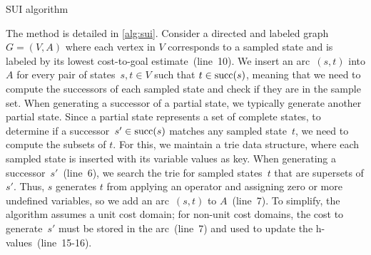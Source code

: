 \begin{algorithm}[tb]
    \caption{SUI algorithm}
    \label{alg:sui}

    \SetAlgoLined


\end{algorithm}

The method is detailed in \cref{alg:sui}. Consider a directed and labeled graph~$G=(V,A)$ where each vertex in $V$ corresponds to a sampled state and is labeled by its lowest cost-to-goal estimate~(line~10). We insert an arc~$(s,t)$ into $A$ for every pair of states~$s,t \in V$ such that $t \in \operatorname{succ}(s)$, meaning that we need to compute the successors of each sampled state and check if they are in the sample set. When generating a successor of a partial state, we typically generate another partial state. Since a partial state represents a set of complete states, to determine if a successor~$s' \in \operatorname{succ}(s)$ matches any sampled state~$t$, we need to compute the subsets of $t$. For this, we maintain a trie data structure, where each sampled state is inserted with its variable values as key. When generating a successor~$s'$~(line~6), we search the trie for sampled states~$t$ that are supersets of $s'$. Thus, $s$ generates $t$ from applying an operator and assigning zero or more undefined variables, so we add an arc~$(s,t)$ to $A$~(line~7). To simplify, the algorithm assumes a unit cost domain; for non-unit cost domains, the cost to generate~$s'$ must be stored in the arc~(line~7) and used to update the h-values~(line~15-16).


